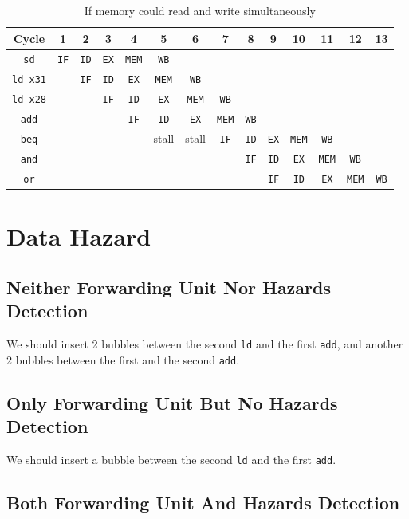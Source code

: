 \documentclass[12pt, a4paper]{article}
\begin{document}
\begin{table}[hbp]
\caption{If memory could read and write simultaneously}
\label{tab:struct_simultaneous}
\centering
\begin{tabular}{cccccccccccccc}
Cycle & 1 & 2 & 3 & 4 & 5 & 6 & 7 & 8 & 9 & 10 & 11 & 12 & 13 \\
\hline
\texttt{sd} & \texttt{IF} & \texttt{ID} & \texttt{EX} & \texttt{MEM} & \texttt{WB} \\
\texttt{ld x31} && \texttt{IF} & \texttt{ID} & \texttt{EX} & \texttt{MEM} & \texttt{WB}\\
\texttt{ld x28} &&& \texttt{IF} & \texttt{ID} & \texttt{EX} & \texttt{MEM} & \texttt{WB}\\
\texttt{add} &&&& \texttt{IF} & \texttt{ID} & \texttt{EX} & \texttt{MEM} & \texttt{WB} \\
\texttt{beq} &&&&& stall & stall & \texttt{IF}& \texttt{ID} & \texttt{EX} & \texttt{MEM} & \texttt{WB} \\
\texttt{and} &&&&&&&& \texttt{IF} & \texttt{ID} & \texttt{EX} & \texttt{MEM} & \texttt{WB} \\
\texttt{or} &&&&&&&&& \texttt{IF} & \texttt{ID} & \texttt{EX} & \texttt{MEM} & \texttt{WB}
\end{tabular}
\end{table}

\section{Data Hazard}

\subsection{Neither Forwarding Unit Nor Hazards Detection}

We should insert 2 bubbles between the second \texttt{ld} and the first \texttt{add}, and another 2 bubbles between the first and the second \texttt{add}.

\subsection{Only Forwarding Unit But No Hazards Detection}

We should insert a bubble between the second \texttt{ld} and the first \texttt{add}.

\subsection{Both Forwarding Unit And Hazards Detection}
\end{document}
